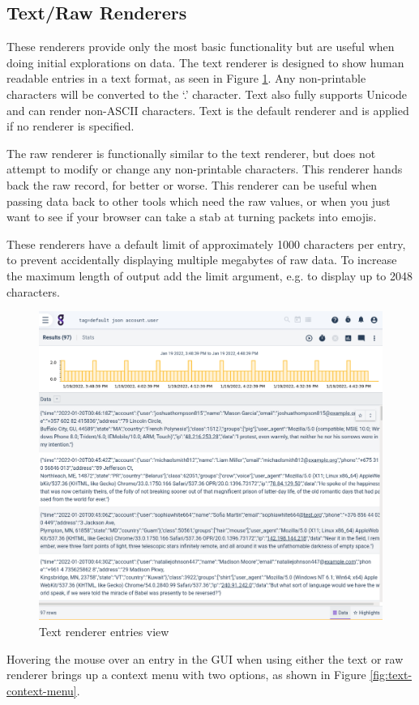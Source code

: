\subsection{Text/Raw Renderers}

These renderers provide only the most basic functionality but are
useful when doing initial explorations on data. The text renderer is
designed to show human readable entries in a text format, as seen in Figure \ref{fig:text-entries}. Any
non-printable characters will be converted to the `.' character. Text
also fully supports Unicode and can render non-ASCII characters. Text is
the default renderer and is applied if no renderer is specified.

The raw renderer is functionally similar to the text renderer, but does
not attempt to modify or change any non-printable characters. This
renderer hands back the raw record, for better or worse. This renderer
can be useful when passing data back to other tools which need the raw
values, or when you just want to see if your browser can take a stab at
turning packets into emojis.

These renderers have a default limit of approximately 1000 characters per
entry, to prevent accidentally displaying multiple megabytes of raw
data. To increase the maximum length of output add the limit argument, 
e.g.  to display up to 2048 characters.

\begin{figure}
	\includegraphics[width=0.7\linewidth]{images/text-entries.png}
	\caption{Text renderer entries view}
	\label{fig:text-entries}
\end{figure}

Hovering the mouse over an entry in the GUI when using either the text
or raw renderer brings up a context menu with two options, as shown
in Figure \ref{fig:text-context-menu}.

